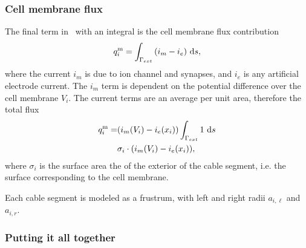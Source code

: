 \subsubsection{Cell membrane flux}
The final term in~ with an integral is the cell membrane flux contribution
\begin{equation}
    q_{i}^{\text{m}} = \int_{\Gamma_{ext}} {(i_m - i_e)} ~\text{d}{s},
\end{equation}
where the current $i_m$ is due to ion channel and synapses, and $i_e$ is any artificial electrode current.
The $i_m$ term is dependent on the potential difference over the cell membrane $V_i$.
The current terms are an average per unit area, therefore the total flux 
\begin{align}
    q_{i}^{\text{m}}
        = & (i_m(V_i) - i_e(x_i))\int_{\Gamma_{ext}} {1} ~\text{d}{s} \nonumber \\
          & \sigma_i\cdot(i_m(V_i) - i_e(x_i)),
\end{align}
where $\sigma_i$ is the surface area the of the exterior of the cable segment, i.e. the surface corresponding to the cell membrane.

Each cable segment is modeled as a frustrum, with left and right radii $a_{i,\ell}$ and $a_{i,r}$.

\subsubsection{Putting it all together}
